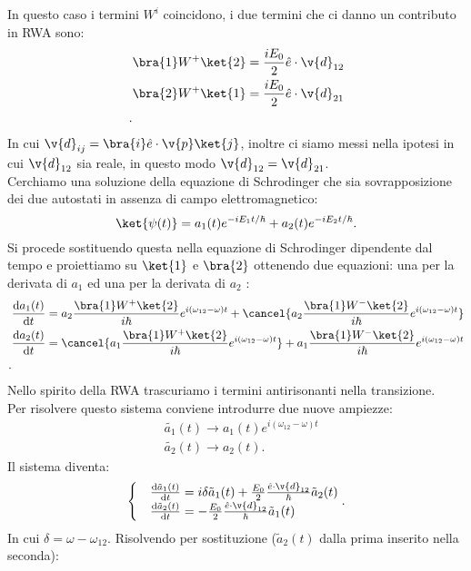 In questo caso i termini $W^i$ coincidono, i due termini che ci danno un contributo in RWA sono:
\[\begin{aligned}
    &\bra{1}W^+\ket{2} = \frac{iE_0}{2}\hat{e}\cdot \v{d}_{12}\\
    &\bra{2}W^+\ket{1} = \frac{iE_0}{2}\hat{e}\cdot \v{d}_{21}\\
.\end{aligned}\]
In cui $\v{d}_{ij}=\bra{i}\hat{e}\cdot \v{p}\ket{j}$, inoltre ci siamo messi nella ipotesi in cui $\v{d}_{12}$ sia reale, in questo modo $\v{d}_{12}=\v{d}_{21}$.\\
Cerchiamo una soluzione della equazione di Schrodinger che sia sovrapposizione dei due autostati in assenza di campo elettromagnetico:
\[
    \ket{\psi(t) } = a_1(t) e^{-iE_1t /\hbar } + a_2(t) e^{-iE_2t /\hbar } 
.\] 
Si procede sostituendo questa nella equazione di Schrodinger dipendente dal tempo e proiettiamo su $\ket{1}$ e $\bra{2}$ ottenendo due equazioni: una per la derivata di $a_1$ ed una per la derivata di $a_2$ :
\[\begin{aligned}
    &\frac{\text{d} a_1(t) }{\text{d} t} =
    a_2 \frac{\bra{1}W^+\ket{2}}{i\hbar }e^{i(\omega_{12}-\omega) t}
    +
    \cancel{a_2\frac{\bra{1}W^-\ket{2}}{i\hbar }e^{i(\omega_{12}-\omega) t}}\\
    &\frac{\text{d} a_2(t) }{\text{d} t} =
    \cancel{a_1 \frac{\bra{1}W^+\ket{2}}{i\hbar }e^{i(\omega_{12}-\omega) t}}
    +
    a_1\frac{\bra{1}W^-\ket{2}}{i\hbar }e^{i(\omega_{12}-\omega) t}\\
.\end{aligned}\]
Nello spirito della RWA trascuriamo i termini antirisonanti nella transizione.\\
Per risolvere questo sistema conviene introdurre due nuove ampiezze:
\[\begin{aligned}
    &\tilde{a_1}(t) \to a_1(t) e^{i(\omega_{12}-\omega) t}\\
    &\tilde{a_2}(t) \to a_2(t)
.\end{aligned}\]
Il sistema diventa:
\[
\begin{cases}
    &\frac{\text{d} \tilde{a}_1(t) }{\text{d} t} = i \delta\tilde{a}_1(t) 
    + \frac{E_0}{2}\frac{\hat{e}\cdot \v{d}_{12}}{\hbar }\tilde{a}_2(t) \\
    &\frac{\text{d} \tilde{a}_2(t)}{\text{d} t} = -\frac{E_0}{2}\frac{\hat{e}\cdot \v{d}_{12}}{\hbar }\tilde{a}_1(t) 
\end{cases}
.\] 
In cui $\delta  =\omega-\omega_{12}$. Risolvendo per sostituzione ($\tilde{a}_2(t)$ dalla prima inserito nella seconda):
